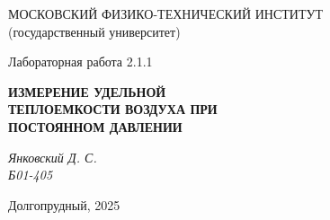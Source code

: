 \thispagestyle{empty}

\begin{center}
    МОСКОВСКИЙ ФИЗИКО-ТЕХНИЧЕСКИЙ ИНСТИТУТ \\
    (государственный университет)
\end{center}

\vfill

\begin{center}
    Лабораторная работа 2.1.1 \\ 
    \vspace{20pt}
    
    \textbf{ИЗМЕРЕНИЕ УДЕЛЬНОЙ} \\
    \textbf{ТЕПЛОЕМКОСТИ ВОЗДУХА ПРИ} \\
    \textbf{ПОСТОЯННОМ ДАВЛЕНИИ} \\
\end{center}  

\begin{center}
    \textit{Янковский Д. С.} \\
    \textit{Б01-405} \\
\end{center}  

\vfill

\begin{center}
    Долгопрудный, 2025
\end{center}